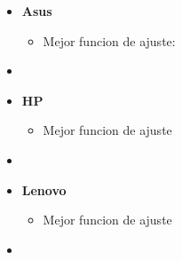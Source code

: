 \documentclass{homework}
\begin{document}
    \begin{itemize}

        \item \textbf{Asus}
            \begin{itemize}
                \item Mejor funcion de ajuste: $ $
            \end{itemize}
        \item 

        \item \textbf{HP}
            \begin{itemize}
                \item Mejor funcion de ajuste
            \end{itemize}
        \item 

        \item \textbf{Lenovo}
            \begin{itemize}
                \item Mejor funcion de ajuste
            \end{itemize}
        \item 

        
    \end{itemize}

    
\end{document}
